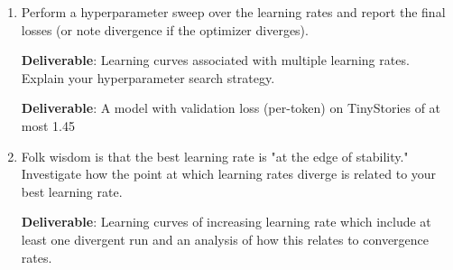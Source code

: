 \begin{enumerate}[label=(\alph*)]
    \item Perform a hyperparameter sweep over the learning rates and report the final losses (or note divergence if the optimizer diverges).
    
    \textbf{Deliverable}: Learning curves associated with multiple learning rates. Explain your hyperparameter search strategy.
    
    \textbf{Deliverable}: A model with validation loss (per-token) on TinyStories of at most 1.45
    
    \item Folk wisdom is that the best learning rate is "at the edge of stability." Investigate how the point at which learning rates diverge is related to your best learning rate.
    
    \textbf{Deliverable}: Learning curves of increasing learning rate which include at least one divergent run and an analysis of how this relates to convergence rates.
\end{enumerate}

